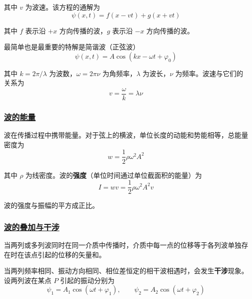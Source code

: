 其中 $v$ 为波速。该方程的通解为
\begin{equation}
    \psi(x,t) = f(x - vt) + g(x + vt)
\end{equation}

其中 $f$ 表示沿 $+x$ 方向传播的波，$g$ 表示沿 $-x$ 方向传播的波。

最简单也是最重要的特解是简谐波（正弦波）
\begin{equation}
    \psi(x,t) = A\cos(kx - \omega t + \varphi_0)
\end{equation}

其中 $k = 2\pi/\lambda$ 为波数，$\omega = 2\pi\nu$ 为角频率，$\lambda$ 为波长，$\nu$ 为频率。波速与它们的关系为
\begin{equation}
    v = \frac{\omega}{k} = \lambda\nu
\end{equation}

\subsubsection{\protect\hyperlink{:}{波的能量}}

波在传播过程中携带能量。对于弦上的横波，单位长度的动能和势能相等，总能量密度为
\begin{equation}
    w = \frac{1}{2}\rho\omega^2 A^2
\end{equation}

其中 $\rho$ 为线密度。波的\textbf{强度}（单位时间通过单位截面积的能量）为
\begin{equation}
    I = wv = \frac{1}{2}\rho\omega^2 A^2 v
\end{equation}

波的强度与振幅的平方成正比。

\subsubsection{\protect\hyperlink{:}{波的叠加与干涉}}

\begin{theorem}[叠加原理]
    当两列或多列波同时在同一介质中传播时，介质中每一点的位移等于各列波单独存在时在该点引起的位移的矢量和。
\end{theorem}

当两列频率相同、振动方向相同、相位差恒定的相干波相遇时，会发生\textbf{干涉}现象。设两列波在某点 $P$ 引起的振动分别为
\begin{equation}
    \psi_1 = A_1\cos(\omega t + \varphi_1), \qquad \psi_2 = A_2\cos(\omega t + \varphi_2)
\end{equation}

